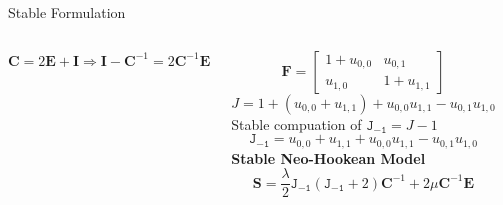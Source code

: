 \documentclass[aspectratio=169,xcolor=dvipsnames]{beamer}
\newcommand{\bm}{\boldsymbol}
\begin{document}
\begin{frame}{Stable Formulation}
    \begin{columns}[c] %

        $\bm{C} = 2\bm{E} +  \bm{I} \Longrightarrow \bm{I} - \bm{C}^{-1} = 2 \bm{C}^{-1} \bm{E} $

        $$\bm{F} = \begin{bmatrix}
            1 + u_{0,0} & u_{0,1} \\
            u_{1,0} & 1 + u_{1,1}
        \end{bmatrix}$$
        $$J = 1 + (u_{0,0} + u_{1,1}) + u_{0,0} u_{1,1} - u_{0,1} u_{1,0} $$
        Stable compuation of $\mathtt{J_{-1}}=J - 1$ 
        $$\mathtt{J_{-1}} = u_{0,0} + u_{1,1} + u_{0,0} u_{1,1} - u_{0,1} u_{1,0} $$
        \textbf{Stable Neo-Hookean Model}
        \begin{equation}
            \bm{S} = \frac{\lambda}{2} \mathtt{J_{-1}} \left( \mathtt{J_{-1}} + 2 \right) \bm{C}^{-1} + 2 \mu \bm{C}^{-1} \bm{E} \nonumber 
        \end{equation}
        \begin{figure}
            \includegraphics[width=1.0\linewidth]{figures/stable-unstable.png}
        \end{figure}
    \end{columns}

\end{frame}
\end{document}
